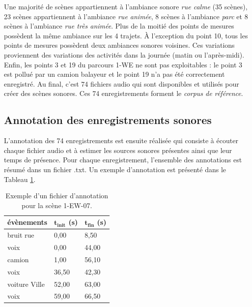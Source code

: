 

Une majorité de scènes appartiennent à l'ambiance sonore \textit{rue calme} (35 scènes), 23 scènes appartiennent à l'ambiance \textit{rue animée}, 8 scènes à l'ambiance \textit{parc} et 8 scènes à l'ambiance \textit{rue très animée}. Plus de la moitié des points de mesures possèdent la même ambiance sur les 4 trajets. À l'exception du point 10, tous les points de mesures possèdent deux ambiances sonores voisines. Ces variations proviennent des variations des activités dans la journée (matin ou l'après-midi). Enfin, les points 3 et 19 du parcours 1-WE ne sont pas exploitables : le point 3 est pollué par un camion balayeur et le point 19 n'a pas été correctement enregistré. Au final, c'est 74 fichiers audio qui sont disponibles et utilisés pour créer des scènes sonores. Ces 74 enregistrements forment le \textit{corpus de référence}.

\subsection{Annotation des enregistrements sonores}\label{part:scene_annotation}

L'annotation des 74 enregistrements est ensuite réalisée qui consiste à écouter chaque fichier audio et à estimer les sources sonores présentes ainsi que leur temps de présence. Pour chaque enregistrement, l'ensemble des annotations est résumé dans un fichier .txt. Un exemple d'annotation est présenté dans le Tableau \ref{tab:exemple_annotation}.\\

\begin{table}[h]
\centering
\begin{tabular}{lll}
\toprule
\textbf{évènements}    & $\mathbf{t_{init}}$ \textbf{(s)} & $\mathbf{t_{fin}}$ \textbf{(s)} \\ \midrule
bruit rue     & 0,00            & 8,50           \\
\rowcolor[HTML]{C0C0C0}
voix          & 0,00            & 44,00          \\
camion        & 1,00            & 56,10          \\
\rowcolor[HTML]{C0C0C0}
voix          & 36,50           & 42,30          \\
voiture Ville & 52,00          & 63,00          \\
\rowcolor[HTML]{C0C0C0}
voix          & 59,00           & 66,50         \\ \bottomrule
\end{tabular}
\caption{Exemple d'un fichier d'annotation pour la scène 1-EW-07.}
\label{tab:exemple_annotation}
\end{table}

